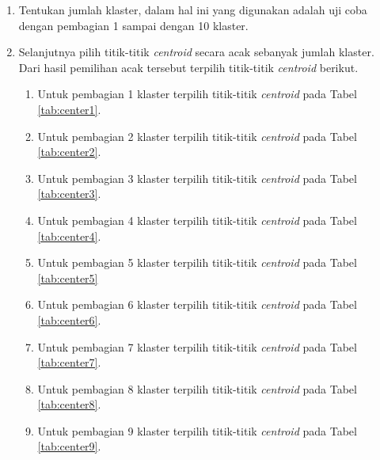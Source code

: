 \begin{enumerate}
	\item Tentukan jumlah klaster, dalam hal ini yang digunakan adalah uji coba dengan pembagian 1 sampai dengan 10 klaster.
	\item Selanjutnya pilih titik-titik \textit{centroid} secara acak sebanyak jumlah klaster. Dari hasil pemilihan acak tersebut terpilih titik-titik \textit{centroid} berikut.
	
	\begin{enumerate}
	
	\item Untuk pembagian 1 klaster terpilih titik-titik \textit{centroid} pada Tabel \ref{tab:center1}.
	


	\item Untuk pembagian 2 klaster terpilih titik-titik \textit{centroid} pada Tabel \ref{tab:center2}.



	\item Untuk pembagian 3 klaster terpilih titik-titik \textit{centroid} pada Tabel \ref{tab:center3}.
	


	\item Untuk pembagian 4 klaster terpilih titik-titik \textit{centroid} pada Tabel \ref{tab:center4}.
	

	
	\item Untuk pembagian 5 klaster terpilih titik-titik \textit{centroid} pada Tabel \ref{tab:center5}
	


	\item Untuk pembagian 6 klaster terpilih titik-titik \textit{centroid} pada Tabel \ref{tab:center6}.
	


	\item Untuk pembagian 7 klaster terpilih titik-titik \textit{centroid} pada Tabel \ref{tab:center7}.
	


	\item Untuk pembagian 8 klaster terpilih titik-titik \textit{centroid} pada Tabel \ref{tab:center8}.



	\item Untuk pembagian 9 klaster terpilih titik-titik \textit{centroid} pada Tabel \ref{tab:center9}.
	

\end{enumerate}
\end{enumerate}
